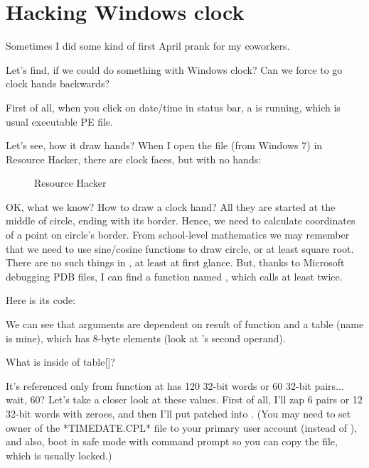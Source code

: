 \section{Hacking Windows clock}

Sometimes I did some kind of first April prank for my coworkers.

Let's find, if we could do something with Windows clock?
Can we force to go clock hands backwards?

First of all, when you click on date/time in status bar, a  is running,
which is usual executable PE file.

Let's see, how it draw hands?
When I open the file (from Windows 7) in Resource Hacker, there are clock faces, but with no hands:

\begin{figure}[H]
\centering
{}
\caption{Resource Hacker}
\end{figure}

OK, what we know? How to draw a clock hand? All they are started at the middle of circle, ending with its border.
Hence, we need to calculate coordinates of a point on circle's border.
From school-level mathematics we may remember that we need to use sine/cosine functions to draw circle, or at least
square root.
There are no such things in , at least at first glance.
But, thanks to Microsoft debugging PDB files, I can find a function named , which calls
 at least twice.

Here is its code:



We can see that  arguments are dependent on result of  function
and a  table (name is mine),
which has 8-byte elements (look at 's second operand).

What is inside of table[]?



It's referenced only from  function at has 120 32-bit words or 60 32-bit pairs... wait, 60?
Let's take a closer look at these values.
First of all, I'll zap 6 pairs or 12 32-bit words with zeroes, and then I'll put patched 
into .
(You may need to set owner of the *TIMEDATE.CPL* file to your primary user account (instead of ),
and also, boot in safe mode with command prompt so you can copy the file, which is usually locked.)

